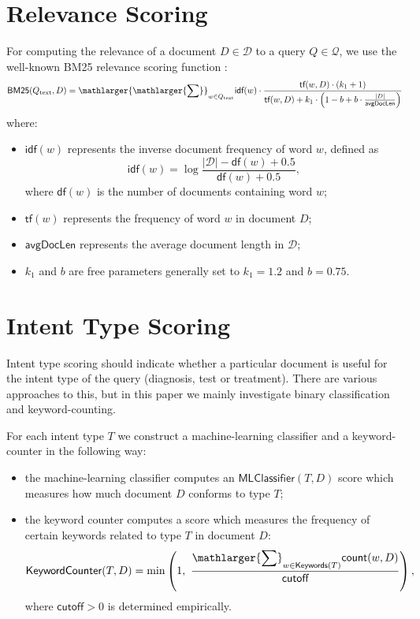 \section{Relevance Scoring}
For computing the relevance of a document $D\in\mathcal{D}$ to a query $Q\in\mathcal{Q}$,
we use the well-known BM25 relevance scoring function \cite{bm25}:
\begin{equation}\label{bm25-formula}
\textsf{BM25}(Q_{\text{text}},D)
 = \displaystyle\mathlarger{\mathlarger{\sum}}_{w\in Q_{\text{text}}} \textsf{idf}(w)\cdot\displaystyle\frac{\textsf{tf}(w,D)\cdot(k_1+1)}{\textsf{tf}(w,D)+k_1\cdot\left(1-b+b\cdot\frac{|D|}{\textsf{avgDocLen}}\right)}
\end{equation}
where:
\begin{itemize}
 \item $\textsf{idf}(w)$ represents the inverse document frequency of word $w$, defined as
\[\textsf{idf}(w) = \log \displaystyle\frac{|\mathcal{D}|-\textsf{df}(w)+0.5}{\textsf{df}(w)+0.5},\]
where $\textsf{df}(w)$ is the number of documents containing word $w$;
\item $\textsf{tf}(w)$ represents the frequency of word $w$ in document $D$;
\item $\textsf{avgDocLen}$ represents the average document length in $\mathcal{D}$;
\item $k_1$ and $b$ are free parameters generally set to $k_1=1.2$ and $b=0.75$.
\end{itemize}

\section{Intent Type Scoring}\label{intent-scoring}
Intent type scoring should indicate whether a particular document is useful for the intent type of the query
(diagnosis, test or treatment). There are various approaches to this, but in this paper we mainly investigate
binary classification and keyword-counting.

For each intent type $T$ we construct a machine-learning classifier and a keyword-counter in the following way:
\begin{itemize}
 \item the machine-learning classifier computes an $\textsf{MLClassifier}(T,D)$ score which measures how much document $D$ conforms to type $T$;
 \item the keyword counter computes a score which measures the frequency of certain keywords related to type $T$ in document $D$:
 \begin{equation}\label{basic-formula}
  \textsf{KeywordCounter}(T,D) = \min\left(1,\,\, \displaystyle\frac{\displaystyle\mathlarger{\sum}_{w\in \textsf{Keywords}(T)} \textsf{count}(w,D)}{\textsf{cutoff}}\right),
 \end{equation}
  where $\textsf{cutoff} > 0$ is determined empirically.
\end{itemize}

